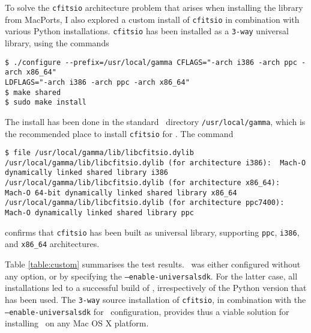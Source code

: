 \documentclass{article}[12pt,a4]
\begin{document}
To solve the {\tt cfitsio} architecture problem that arises when installing the library from
MacPorts, I also explored a custom install of {\tt cfitsio} in combination with various
Python installations.
{\tt cfitsio} has been installed as a {\tt 3-way} universal library, using the commands
{\small\begin{verbatim}
$ ./configure --prefix=/usr/local/gamma CFLAGS="-arch i386 -arch ppc -arch x86_64" 
LDFLAGS="-arch i386 -arch ppc -arch x86_64"
$ make shared
$ sudo make install
\end{verbatim}}
The install has been done in the standard \this\ directory {\tt /usr/local/gamma}, which is the
recommended place to install {\tt cfitsio} for \this.
The command
{\small\begin{verbatim}
$ file /usr/local/gamma/lib/libcfitsio.dylib
/usr/local/gamma/lib/libcfitsio.dylib (for architecture i386):	Mach-O dynamically linked shared library i386
/usr/local/gamma/lib/libcfitsio.dylib (for architecture x86_64):	Mach-O 64-bit dynamically linked shared library x86_64
/usr/local/gamma/lib/libcfitsio.dylib (for architecture ppc7400):	Mach-O dynamically linked shared library ppc
\end{verbatim}}
confirms that {\tt cfitsio} has been built as universal library, supporting {\tt ppc}, {\tt i386}, and
{\tt x86\_64} architectures.

Table \ref{table:custom} summarises the test results.
\this\ was either configured without any option, or by specifying the {\tt --enable-universalsdk}.
For the latter case, all installations led to a successful build of \this, irrespectively of the
Python version that has been used.
The {\tt 3-way} source installation of {\tt cfitsio}, in combination with the {\tt --enable-universalsdk}
for \this\ configuration, provides thus a viable solution for installing \this\ on any Mac OS X
platform.
\end{document}
